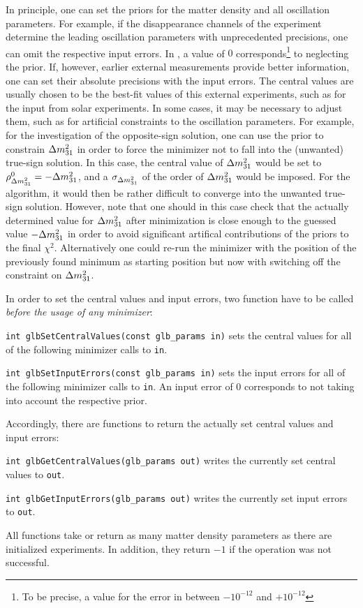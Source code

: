 In principle, one can set the priors for the matter density and all oscillation parameters. For example, if the disappearance channels of the experiment determine the leading oscillation parameters with unprecedented
precisions, one can omit the respective input errors. In \GLOBES , a
value of $0$ corresponds\footnote{To be precise, a value for the error
in between $-10^{-12}$ and $+10^{-12}$} to neglecting the prior. If, however,
 earlier external measurements provide better information, one can set their 
absolute precisions with the input errors. The central values are usually 
chosen to be the best-fit values of this external experiments, such as
for the input from solar experiments. In some cases, it may be
necessary to adjust them, such as for artificial constraints to the
oscillation parameters. 
For example, for the investigation of the
opposite-sign solution, one can use the prior to constrain $\Delta m_{31}^2$
in order to force the minimizer not to  fall into the (unwanted) 
true-sign solution. In this case, the central value of $\Delta m_{31}^2$ would 
be set to $\rho^0_{\Delta m_{31}^2} = - \Delta m_{31}^2$, and a $\sigma_{\Delta m_{31}^2}$ of the order 
of $\Delta m_{31}^2$ would be imposed. For the algorithm, it would 
then be rather difficult 
to converge into the unwanted true-sign solution. However, note that 
one should in this case check that the actually determined value 
for $\Delta m_{31}^2$ after minimization is close enough to the guessed value $-\Delta m_{31}^2$ 
in order to avoid significant artifical contributions of the priors to the 
final $\chi^2$. Alternatively one could re-run the minimizer with the
position of the previously found minimum as starting position but now
with switching off the constraint on $\Delta m_{31}^2$.

In order to set the central values and input errors, two function have to
 be called {\em before the usage of any minimizer}:
\begin{function}
{\tt int glbSetCentralValues(const glb\_params in)} sets the central values for all of the following minimizer calls to {\tt in}.
\end{function}
\begin{function}
{\tt int glbSetInputErrors(const glb\_params in)}
 sets the input errors for all of the following minimizer calls to {\tt in}.
 An input error of $0$ corresponds to not taking into account the
 respective prior.
\end{function}
Accordingly, there are functions to return the actually set central values
and input errors:
\begin{function}
{\tt int glbGetCentralValues(glb\_params out)} writes the currently
set central values to {\tt out}.
\end{function}
\begin{function}
{\tt int glbGetInputErrors(glb\_params out)}
 writes the currently set input errors to {\tt out}.
\end{function}
All functions take or return as many matter density parameters as there are initialized experiments. In addition, they return $-1$ if the operation
was not successful.

